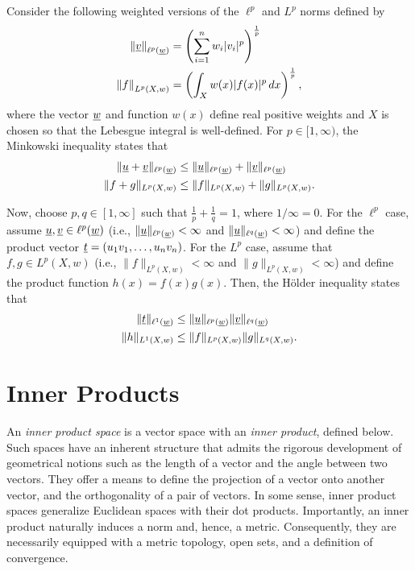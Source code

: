 \begin{theorem} \label{thm:HolderMinkowski}

Consider the following weighted versions of the $\ell^p$ and $L^p$ norms defined by
\begin{align*}
\left\| \underline{v} \right\|_{\ell^p (\underline{w})} &= \left( \sum_{i=1}^n w_i |v_i|^p \right)^{\frac{1}{p}} \\
\left\| f \right\|_{L^p (X,w)} &= \left( \int_X w(x) |f(x)|^p \, dx \right)^{\frac{1}{p}},
\end{align*}
where the vector $\underline{w}$ and function $w(x)$ define real positive weights and $X$ is chosen so that the Lebesgue integral is well-defined.
For $p\in [1,\infty)$, the Minkowski inequality states that
\begin{align*}
\| \underline{u} + \underline{v} \|_{\ell^p (\underline{w})} &\leq \| \underline{u} \|_{\ell^p (\underline{w})} + \| \underline{v} \|_{\ell^p (\underline{w})} \\
\| f+g \|_{L^p (X,w)} &\leq \| f \|_{L^p (X,w)} + \|g \|_{L^p (X,w)}.
\end{align*}

Now, choose $p,q \in [1,\infty]$ such that $\frac{1}{p}+\frac{1}{q} = 1$, where $1/\infty=0$.
For the $\ell^p$ case, assume $\underline{u},\underline{v} \in \ell^p (\underline{w}) $ (i.e., $\| \underline{u} \|_{\ell^p (\underline{w})} < \infty$ and $\| \underline{u} \|_{\ell^q (\underline{w})} < \infty$) and define the product vector $\underline{t} = (u_1 v_1,\ldots, u_n v_n)$.
For the $L^p$ case, assume that $f,g \in L^p (X,w)$ (i.e., $\| f \|_{L^p (X,w)} < \infty$ and $\| g \|_{L^p (X,w)} < \infty$) and define the product function $h(x) = f(x) g(x)$.
Then, the H\"{o}lder inequality states that
\begin{align*}
\| \underline{t} \|_{\ell^1 (\underline{w})} &\leq \| \underline{u} \|_{\ell^p (\underline{w})} \| \underline{v} \|_{\ell^q (\underline{w})} \\
\| h \|_{L^1 (X,w)} &\leq \| f \|_{L^p (X,w)} \|g \|_{L^q (X,w)}.
\end{align*}

\end{theorem}


\section{Inner Products}

An \emph{inner product space} is a vector space with an \emph{inner product}, defined below.
Such spaces have an inherent structure that admits the rigorous development of geometrical notions such as the length of a vector and the angle between two vectors.
They offer a means to define the projection of a vector onto another vector, and the orthogonality of a pair of vectors.
In some sense, inner product spaces generalize Euclidean spaces with their dot products.
Importantly, an inner product naturally induces a norm and, hence, a metric.
Consequently, they are necessarily equipped with a metric topology, open sets, and a definition of convergence.

